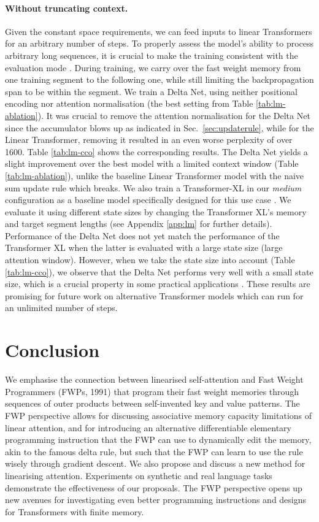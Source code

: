 \documentclass{article}
\theoremstyle{definition}
\begin{document}
\paragraph{Without truncating context.}
Given the constant space requirements,
we can feed inputs to linear Transformers
for an arbitrary number of steps.
To properly assess the 
model's ability to process arbitrary long sequences, it is crucial to
make the training consistent with the evaluation mode \citep{irie19asru}.
During training, we carry over the fast weight memory from one training segment
to the following one, while still limiting the backpropagation span to be within the segment.
We train a Delta Net, using neither positional encoding
nor attention normalisation (the best setting from Table \ref{tab:lm-ablation}).
It was crucial to remove the attention normalisation
for the Delta Net since the accumulator blows up as indicated in Sec.~\ref{sec:updaterule},
while for the Linear Transformer, removing it resulted
in an even worse perplexity of over 1600.
Table \ref{tab:lm-cco} shows the corresponding results.
The Delta Net yields a slight improvement over the best model with a limited context window (Table \ref{tab:lm-ablation}),
unlike the baseline Linear Transformer model with the naive sum update rule which breaks.
We also train a Transformer-XL in our \textit{medium} configuration
as a baseline model specifically designed for this use case
\citep{dai2019transformerxlacl, rae2020compressive}.
We evaluate it using different state sizes by
changing the Transformer XL's memory and target segment lengths (see Appendix \ref{app:lm} for further details).
Performance of the Delta Net does not yet match the
performance of the Transformer XL
when the latter is evaluated with a large state size (large attention window).
However, when we take the state size into account (Table \ref{tab:lm-cco}),
we observe that the Delta Net performs very well
with a small state size,
which is a crucial property in some practical
applications \citep{irie:icassp20}.
These results are promising for future work on alternative
Transformer models which can run for an unlimited number of steps.

\section{Conclusion}
We emphasise the connection between linearised self-attention and Fast Weight Programmers (FWPs, 1991) that program their fast weight memories through sequences of outer products between self-invented key and value patterns. 
The FWP perspective allows for discussing associative memory
capacity limitations of linear attention, and for introducing an alternative differentiable 
elementary programming instruction that the FWP can use to dynamically edit the memory, akin to the famous delta rule, but such that the FWP can learn to use the rule wisely through gradient descent.
We also propose and discuss a new method for linearising  attention.
Experiments on synthetic and real language tasks demonstrate
the effectiveness of our proposals.
The FWP perspective opens up new avenues for investigating even better programming instructions and designs for Transformers with finite memory.
\end{document}
